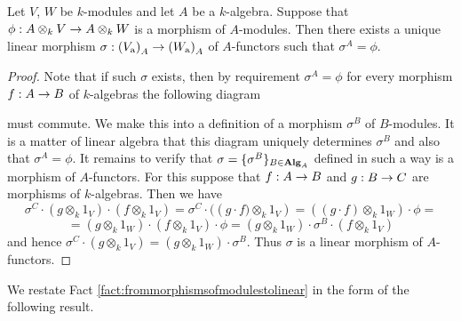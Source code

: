 \begin{fact}\label{fact:frommorphismsofmodulestolinear}
Let $V$, $W$ be $k$-modules and let $A$ be a $k$-algebra. Suppose that  $\phi:A\otimes_kV\rightarrow A\otimes_kW$ is a morphism of $A$-modules. Then there exists a unique linear morphism $\sigma:\left(V_{\mathrm{a}}\right)_A\rightarrow \left(W_{\mathrm{a}}\right)_A$ of $A$-functors such that $\sigma^A = \phi$.
\end{fact}
\begin{proof}
Note that if such $\sigma$ exists, then by requirement $\sigma^A = \phi$ for every morphism $f:A\rightarrow B$ of $k$-algebras the following diagram
\begin{center}
\end{center}
must commute. We make this into a definition of a morphism $\sigma^B$ of $B$-modules. It is a matter of linear algebra that this diagram uniquely determines $\sigma^B$ and also that $\sigma^A = \phi$. It remains to verify that $\sigma = \{\sigma^B\}_{B\in \mathbf{Alg}_A}$ defined in such a way is a morphism of $A$-functors. For this suppose that $f:A\rightarrow B$ and $g:B\rightarrow C$ are morphisms of $k$-algebras. Then we have
$$\sigma^C \cdot (g \otimes_k 1_V) \cdot (f\otimes_k 1_V) = \sigma^C \cdot (\left (g\cdot f) \otimes_k 1_V\right) = \left((g\cdot f) \otimes_k 1_W \right) \cdot \phi = $$
$$ = (g \otimes_k 1_W) \cdot (f \otimes_k 1_V)\cdot \phi= (g \otimes_k 1_W)\cdot \sigma^B \cdot (f \otimes_k 1_V)$$
and hence $\sigma^C \cdot (g \otimes_k 1_V) = (g \otimes_k 1_W) \cdot \sigma^B$. Thus $\sigma$ is a linear morphism of $A$-functors.
\end{proof}
\noindent
We restate Fact \ref{fact:frommorphismsofmodulestolinear} in the form of the following result.

